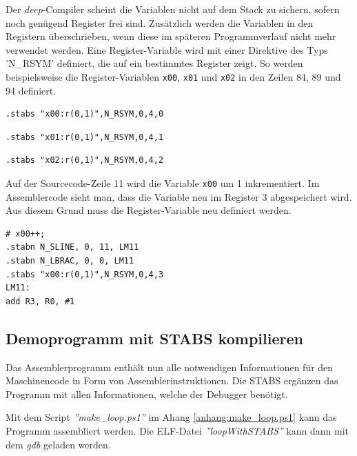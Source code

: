 Der \textit{deep}-Compiler scheint die Variablen nicht auf dem Stack zu sichern, sofern noch genügend Register frei sind.
Zusätzlich werden die Variablen in den Registern überschrieben, wenn diese im späteren Programmverlauf nicht mehr verwendet werden.
Eine Register-Variable wird mit einer Direktive des Typs 'N\_RSYM' definiert, die auf ein bestimmtes Register zeigt.
So werden beispielsweise die Register-Variablen \texttt{x00}, \texttt{x01} und \texttt{x02} in den Zeilen 84, 89 und 94 definiert.

\begin{lstlisting}
.stabs "x00:r(0,1)",N_RSYM,0,4,0
\end{lstlisting}

\begin{lstlisting}
.stabs "x01:r(0,1)",N_RSYM,0,4,1
\end{lstlisting}

\begin{lstlisting}
.stabs "x02:r(0,1)",N_RSYM,0,4,2
\end{lstlisting}
\lstset{firstnumber=1}


Auf der Sourcecode-Zeile 11 wird die Variable \texttt{x00} um 1 inkrementiert.
Im Assemblercode sieht man, dass die Variable neu im Register 3 abgespeichert wird.
Aus diesem Grund muss die Register-Variable neu definiert werden.

\begin{lstlisting}
# x00++;
.stabn N_SLINE, 0, 11, LM11
.stabn N_LBRAC, 0, 0, LM11
.stabs "x00:r(0,1)",N_RSYM,0,4,3
LM11:
add R3, R0, #1
\end{lstlisting}
\lstset{firstnumber=1}



\subsection{Demoprogramm mit STABS kompilieren}
Das Assemblerprogramm enthält nun alle notwendigen Informationen für den Maschinencode in Form von Assemblerinstruktionen.
Die STABS ergänzen das Programm mit allen Informationen, welche der Debugger benötigt.

Mit dem Script \textit{''make\_loop.ps1''} im Ahang \ref{anhang:make_loop.ps1} kann das Programm assembliert werden.
Die ELF-Datei \textit{''loopWithSTABS''} kann dann mit dem \textit{gdb} geladen werden.


